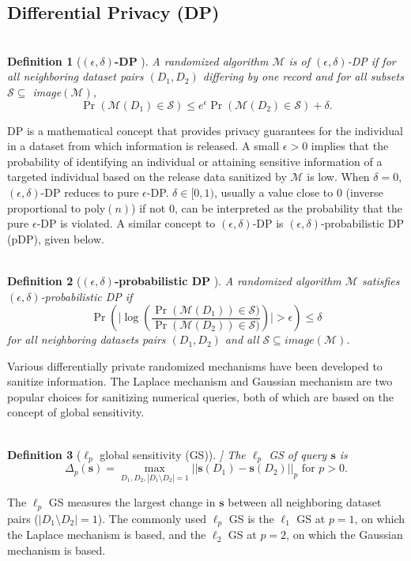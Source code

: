 \documentclass[10pt,journal,compsoc]{IEEEtran}
\newtheorem{defn}{\vspace{-6pt}\\ Definition}
\newcommand{\s}{\mathbf{s}}
\newcommand{\M}{\mathcal{M}}
\begin{document}
\vspace{-6pt}\subsection{Differential Privacy (DP)}\vspace{-7pt}
\begin{defn}[\textbf{$(\epsilon,\delta)$-DP} 
\citep{dwork2006calibrating,dwork2006our}]\label{defn:adp}
A randomized algorithm $\M$ is of $(\epsilon,\delta)$-DP if for  all neighboring dataset pairs $(D_1,D_2)$ differing by one record and for all subsets $\mathcal{S}\subseteq$ image$(\M)$,
\begin{equation}\label{eqn:DP}
\Pr(\mathcal{M}(D_1)\in \mathcal{S}) \leq e^{\epsilon} \Pr(\mathcal{M}(D_2)\in \mathcal{S})+\delta.
\end{equation}
\end{defn}
\vspace{-6pt}

DP is a mathematical concept that provides privacy guarantees for the individual in a dataset from which information is released. A small $\epsilon>0$ implies that the probability of identifying an individual or attaining sensitive information of a targeted individual based on the release data sanitized  by $\mathcal{M}$ is low. When $\delta=0$, $(\epsilon,\delta)$-DP reduces to pure $\epsilon$-DP. $\delta\in[0,1)$, usually a value close to 0 (inverse proportional to poly$(n)$) if not 0,  can be interpreted as the probability that the pure $\epsilon$-DP is violated. A similar concept to $(\epsilon, \delta)$-DP  is $(\epsilon, \delta)$-probabilistic DP (pDP), given below.
\begin{defn}[\textbf{$(\epsilon,\delta)$-probabilistic DP} 
\citep{machanavajjhala2008privacy}]\label{defn:pdp}
A randomized algorithm $\M$ satisfies $(\epsilon,\delta)$-probabilistic DP if
\begin{equation}\label{eqn:pDP}
\Pr\left(\bigg|\log\left(\frac{\Pr(\M(D_1))\in \mathcal{S})}{\Pr(\M(D_2))\in \mathcal{S})}\right)\bigg|> \epsilon\right)\leq \delta
\end{equation}
for all neighboring datasets pairs $(D_1,D_2)$ and  all $\mathcal{S}\subseteq image(\M)$.
\end{defn}
Various differentially private randomized mechanisms have been developed to sanitize information.  The  Laplace mechanism  and Gaussian mechanism are two popular choices for sanitizing numerical queries, both of which are based on the concept of global sensitivity.
\begin{defn}[$\ell_p$ global sensitivity (GS)] \citep{liu2018generalized}]
The $\ell_p$ GS of query $\s$ is\vspace{-3pt}
$$\Delta_p(\s)=\max_{D_1,D_2,|D_1\setminus D_2|=1} ||\s(D_1)-\s(D_2)||_p\mbox{ for } p>0.$$\vspace{-12pt}
\end{defn}
The $\ell_p$ GS measures the largest change in $\s$ between all neighboring dataset pairs ($|D_1\setminus D_2|=1$). The commonly used $\ell_p$ GS is the $\ell_1$ GS at $p=1$, on which the Laplace mechanism is based, and the $\ell_2$ GS at $p=2$, on which the Gaussian mechanism is based. 
\end{document}
